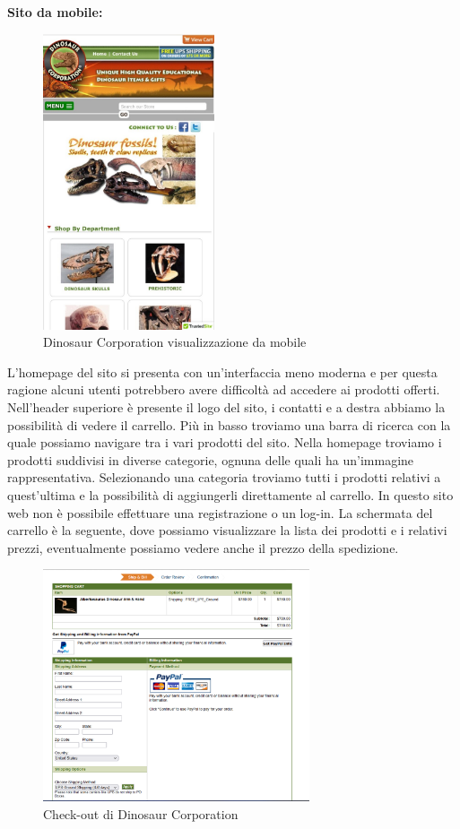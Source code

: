 \textbf{Sito da mobile:}
\begin{figure}[H]
        \centering
        \includegraphics[width=0.45\textwidth]{immagini/dinosaurcorporation_mobile.jpg}
        \caption{Dinosaur Corporation visualizzazione da mobile}
    \end{figure}
L’homepage del sito si presenta con un’interfaccia meno moderna e per questa ragione alcuni utenti potrebbero avere difficoltà ad accedere ai prodotti offerti. Nell’header superiore è presente il logo del sito, i contatti e a destra abbiamo la possibilità di vedere il carrello. Più in basso troviamo una barra di ricerca con la quale possiamo navigare tra i vari prodotti del sito. Nella homepage troviamo i prodotti suddivisi in diverse categorie, ognuna delle quali ha un'immagine rappresentativa. Selezionando una categoria troviamo tutti i prodotti relativi a quest'ultima e la possibilità di aggiungerli direttamente al carrello. In questo sito web non è possibile effettuare una registrazione o un log-in. La schermata del carrello è la seguente, dove possiamo visualizzare la lista dei prodotti e i relativi prezzi, eventualmente possiamo vedere anche il prezzo della spedizione. 
\begin{figure}[H]
        \centering
        \includegraphics[width=0.70\textwidth]{immagini/dinosaur_corporation_checkout.png}
        \caption{Check-out di Dinosaur Corporation }
    \end{figure}
    
